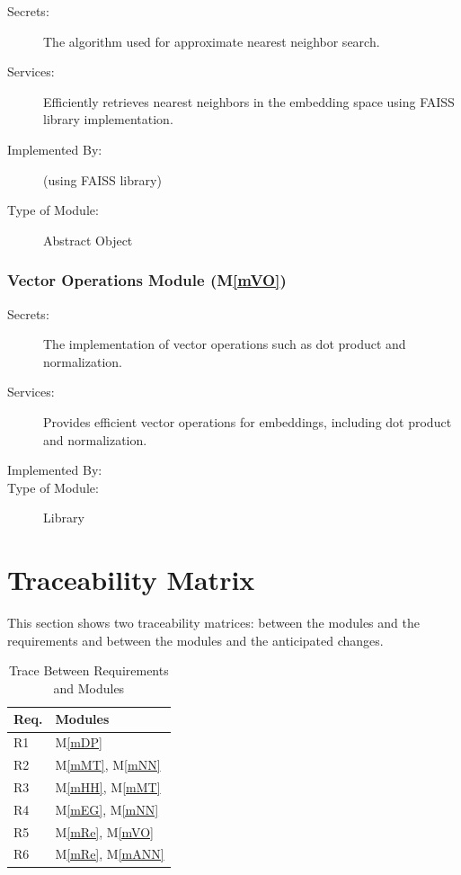 \documentclass[12pt, titlepage]{article}
\newcommand{\mref}[1]{M\ref{#1}}
\begin{document}
\begin{description}
\item[Secrets:]The algorithm used for approximate nearest neighbor search.
\item[Services:]Efficiently retrieves nearest neighbors in the embedding space using FAISS library implementation.
\item[Implemented By:] \progname (using FAISS library)
\item[Type of Module:] Abstract Object
\end{description}

\subsubsection{Vector Operations Module (\mref{mVO})}

\begin{description}
\item[Secrets:]The implementation of vector operations such as dot product and normalization.
\item[Services:]Provides efficient vector operations for embeddings, including dot product and normalization.
\item[Implemented By:] \progname
\item[Type of Module:] Library
\end{description}

\section{Traceability Matrix} \label{SecTM}

This section shows two traceability matrices: between the modules and the
requirements and between the modules and the anticipated changes.

\begin{table}[H]
\centering
\begin{tabular}{p{} p{}}
\toprule
\textbf{Req.} & \textbf{Modules}\\
\midrule
R1 & \mref{mDP}\\
R2 & \mref{mMT}, \mref{mNN}\\
R3 & \mref{mHH}, \mref{mMT}\\
R4 & \mref{mEG}, \mref{mNN}\\
R5 & \mref{mRe}, \mref{mVO}\\
R6 & \mref{mRe}, \mref{mANN}\\
\bottomrule
\end{tabular}
\caption{Trace Between Requirements and Modules}
\label{TblRT}
\end{table}
\end{document}
